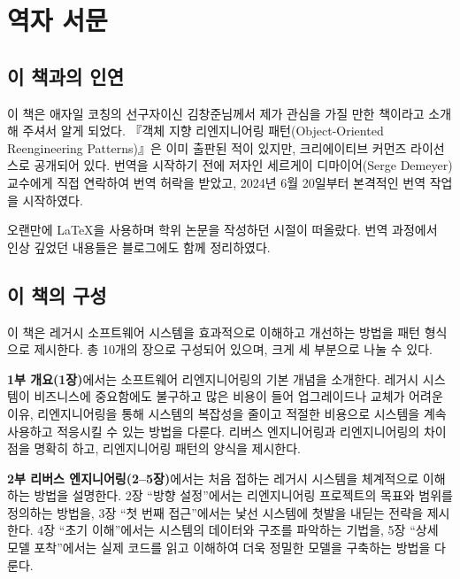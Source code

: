 \documentclass[a4paper,10pt,twoside]{book}
\begin{document}
	\frontmatter
	\sloppy
\fi

\chapter{역자 서문}


\section*{이 책과의 인연}

이 책은 애자일 코칭의 선구자이신 김창준님께서 제가 관심을 가질 만한 책이라고 소개해 주셔서 알게 되었다.
『객체 지향 리엔지니어링 패턴(Object-Oriented Reengineering Patterns)』은 이미 출판된 적이 있지만, 크리에이티브 커먼즈 라이선스로 공개되어 있다.
번역을 시작하기 전에 저자인 세르게이 디마이어(Serge Demeyer) 교수에게 직접 연락하여 번역 허락을 받았고, 2024년 6월 20일부터 본격적인 번역 작업을 시작하였다.

오랜만에 LaTeX을 사용하며 학위 논문을 작성하던 시절이 떠올랐다.
번역 과정에서 인상 깊었던 내용들은 블로그에도 함께 정리하였다.

\section*{이 책의 구성}

이 책은 레거시 소프트웨어 시스템을 효과적으로 이해하고 개선하는 방법을 패턴 형식으로 제시한다.
총 10개의 장으로 구성되어 있으며, 크게 세 부분으로 나눌 수 있다.

\textbf{1부 개요(1장)}에서는 소프트웨어 리엔지니어링의 기본 개념을 소개한다.
레거시 시스템이 비즈니스에 중요함에도 불구하고 많은 비용이 들어 업그레이드나 교체가 어려운 이유,
리엔지니어링을 통해 시스템의 복잡성을 줄이고 적절한 비용으로 시스템을 계속 사용하고 적응시킬 수 있는 방법을 다룬다.
리버스 엔지니어링과 리엔지니어링의 차이점을 명확히 하고, 리엔지니어링 패턴의 양식을 제시한다.

\textbf{2부 리버스 엔지니어링(2--5장)}에서는 처음 접하는 레거시 시스템을 체계적으로 이해하는 방법을 설명한다.
2장 ``방향 설정''에서는 리엔지니어링 프로젝트의 목표와 범위를 정의하는 방법을,
3장 ``첫 번째 접근''에서는 낯선 시스템에 첫발을 내딛는 전략을 제시한다.
4장 ``초기 이해''에서는 시스템의 데이터와 구조를 파악하는 기법을,
5장 ``상세 모델 포착''에서는 실제 코드를 읽고 이해하여 더욱 정밀한 모델을 구축하는 방법을 다룬다.
\end{document}
